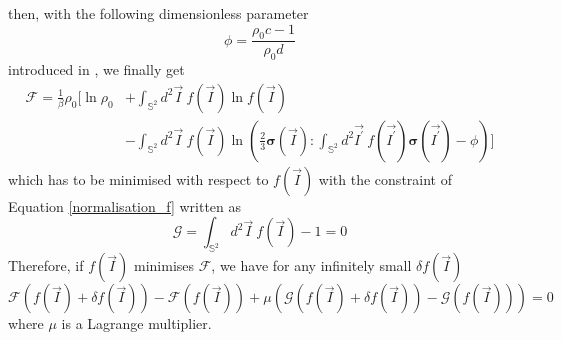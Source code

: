 \documentclass[class=article, float=false, crop=false]{standalone}
\begin{document}
then, with the following dimensionless parameter
\begin{equation}
\phi = \frac{\rho_0 c - 1}{\rho_0 d}
\end{equation}
introduced in \cite{nascimento2017density}, we finally get
\begin{equation}
\begin{aligned}
\mathcal{F} = \frac{1}{\beta}\rho_0 \Bigg[\ln\rho_0 &+ \int_{\mathbb{S}^2}d^2\vec{I}~ f(\vec{I})\ln f(\vec{I}) \\
&- \int_{\mathbb{S}^2}d^2\vec{I}~f(\vec{I})\ln\left(\frac{2}{3}\bm{\sigma}(\vec{I}):\int_{\mathbb{S}^2}d^2\vec{I^{\prime}}~f(\vec{I^{\prime}})\bm{\sigma}(\vec{I^{\prime}}) - \phi\right)\Bigg]
\end{aligned}
\label{free_energy_to_minimise}
\end{equation}
which has to be minimised with respect to $f(\vec{I})$ with the constraint of Equation \ref{normalisation_f} written as
\begin{equation}
\mathcal{G} = \int_{\mathbb{S}^2}d^2\vec{I}~f(\vec{I}) - 1 = 0
\end{equation}
Therefore, if $f(\vec{I})$ minimises $\mathcal{F}$, we have for any infinitely small $\delta f(\vec{I})$
\begin{equation}
\mathcal{F}\left(f(\vec{I})+\delta f(\vec{I})\right) - \mathcal{F}\left(f(\vec{I})\right) + \mu\left(\mathcal{G}\left(f(\vec{I})+\delta f(\vec{I})\right) - \mathcal{G}\left(f(\vec{I})\right)\right) = 0
\label{minimisation_F_G}
\end{equation}
where $\mu$ is a Lagrange multiplier.\\
\end{document}
